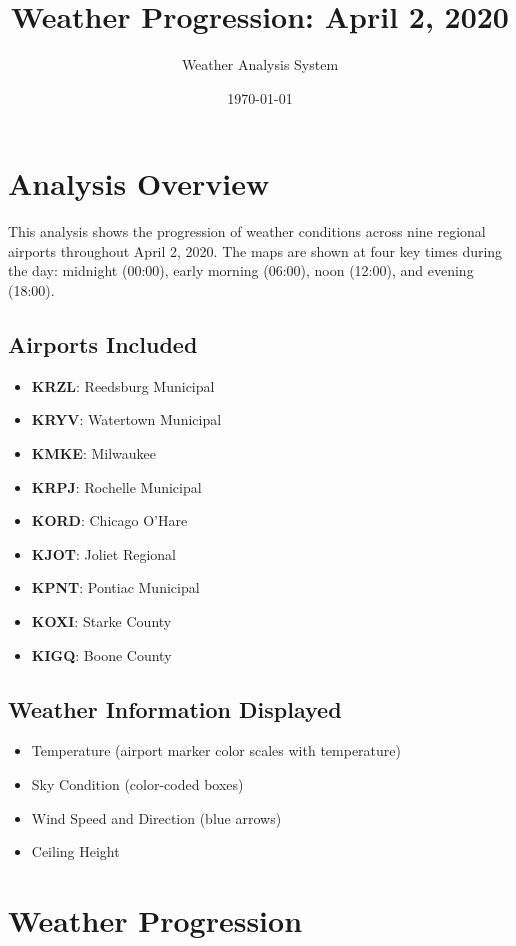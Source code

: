 \documentclass{article}
\title{Weather Progression: April 2, 2020}
\author{Weather Analysis System}
\date{\today}
\begin{document}
\maketitle

\section{Analysis Overview}
This analysis shows the progression of weather conditions across nine regional airports throughout April 2, 2020. The maps are shown at four key times during the day: midnight (00:00), early morning (06:00), noon (12:00), and evening (18:00).

\subsection{Airports Included}
\begin{itemize}
    \item \textbf{KRZL}: Reedsburg Municipal
    \item \textbf{KRYV}: Watertown Municipal
    \item \textbf{KMKE}: Milwaukee
    \item \textbf{KRPJ}: Rochelle Municipal
    \item \textbf{KORD}: Chicago O'Hare
    \item \textbf{KJOT}: Joliet Regional
    \item \textbf{KPNT}: Pontiac Municipal
    \item \textbf{KOXI}: Starke County
    \item \textbf{KIGQ}: Boone County
\end{itemize}

\subsection{Weather Information Displayed}
\begin{itemize}
    \item Temperature (airport marker color scales with temperature)
    \item Sky Condition (color-coded boxes)
    \item Wind Speed and Direction (blue arrows)
    \item Ceiling Height
\end{itemize}

\section{Weather Progression}
\end{document}
